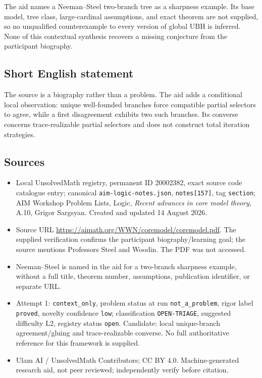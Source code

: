 \documentclass[11pt]{article}
\begin{document}
The aid names a Neeman--Steel two-branch tree as a sharpness example. Its base model, tree class, large-cardinal assumptions, and exact theorem are not supplied, so no unqualified counterexample to every version of global UBH is inferred. None of this contextual synthesis recovers a missing conjecture from the participant biography.
\subsection{Short English statement}
The source is a biography rather than a problem. The aid adds a conditional local observation: unique well-founded branches force compatible partial selectors to agree, while a first disagreement exhibits two such branches. Its converse concerns trace-realizable partial selectors and does not construct total iteration strategies.
\subsection{Sources}
\begin{itemize}
\item Local UnsolvedMath registry, permanent ID 20002382, exact source code catalogue entry; canonical \texttt{aim-logic-notes.json}, \texttt{notes[157]}, tag \texttt{section}; AIM Workshop Problem Lists, Logic, \emph{Recent advances in core model theory}, A.10, Grigor Sargsyan. Created and updated 14 August 2026.
\item Source URL \url{https://aimath.org/WWN/coremodel/coremodel.pdf}. The supplied verification confirms the participant biography/learning goal; the source mentions Professors Steel and Woodin. The PDF was not accessed.
\item Neeman--Steel is named in the aid for a two-branch sharpness example, without a full title, theorem number, assumptions, publication identifier, or separate URL.
\item Attempt 1: \texttt{context\_only}, problem status at run \texttt{not\_a\_problem}, rigor label \texttt{proved}, novelty confidence \texttt{low}; classification \texttt{OPEN-TRIAGE}, suggested difficulty L2, registry status \texttt{open}. Candidate: local unique-branch agreement/gluing and trace-realizable converse. No full authoritative reference for this framework is supplied.
\item Ulam AI / UnsolvedMath Contributors; CC BY 4.0. Machine-generated research aid, not peer reviewed; independently verify before citation.
\end{itemize}
\end{document}
